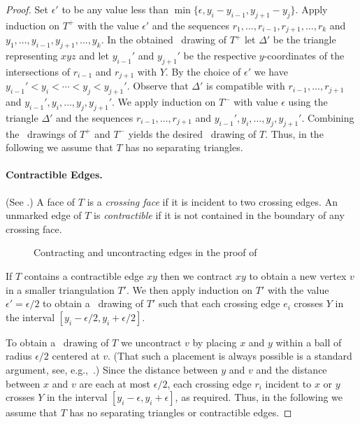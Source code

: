 \begin{proof}
	Set $\epsilon'$ to be any
	value less than $\min\{\epsilon,y_{i}-y_{i-1}, y_{j+1}-y_j\}$. Apply induction on $T^+$ with the value $\epsilon'$ and the sequences $r_1,\ldots,r_{i-1},r_{j+1},\ldots,r_k$ and
	$y_1,\ldots,y_{i-1},y_{j+1},\ldots,y_k$. In the obtained \Fary\ drawing of $T^+$ let $\Delta'$ be the triangle representing  $xyz$ and let $y_{i-1}'$ and $y_{j+1}'$
	be the respective $y$-coordinates of the intersections of
	$r_{i-1}$ and $r_{j+1}$ with $Y$.  By the choice of
	$\epsilon'$ we have $y_{i-1}'<y_i<\cdots<y_j<y_{j+1}'$.  Observe that
	$\Delta'$ is compatible with $r_{i-1},\ldots,r_{j+1}$ and
	$y_{i-1}',y_i,\ldots,y_j,y_{j+1}'$.
	We apply induction on $T^-$ with value $\epsilon$ using the triangle $\Delta'$ and the sequences $r_{i-1},\ldots,r_{j+1}$ and
	$y_{i-1}',y_i,\ldots,y_{j},y_{j+1}'$.  Combining the \Fary\ drawings of $T^+$
	and $T^-$ yields the desired \Fary\ drawing of $T$.  Thus, in the following we assume that $T$ has no separating triangles.
	
	\paragraph{Contractible Edges.}
	(See .)
	A face of $T$ is a \emph{crossing
		face} if it is incident to two crossing edges.  An
	unmarked edge of $T$ is \emph{contractible} if it is not contained
	in the boundary of any crossing face.  
	\begin{figure}
		\caption{Contracting and uncontracting edges in the proof of
			}
	\end{figure}
	
	If $T$ contains a contractible edge $xy$ then we contract $xy$ to
	obtain a new vertex $v$ in a smaller triangulation $T'$.   We then apply
	induction on $T'$ with the value $\epsilon'=\epsilon/2$ to obtain a \Fary\
	drawing of $T'$ such that each crossing edge $e_i$ crosses
	$Y$ in the interval $[y_i-\epsilon/2,y_i+\epsilon/2]$.
	
	To obtain a \Fary\ drawing of $T$ we uncontract $v$ by placing $x$ and $y$
	within a ball of radius $\epsilon/2$ centered at $v$. (That such
	a placement is always possible is a standard argument, see, e.g.,~\cite{fary,w-sp-05}.)  Since the
	distance between $y$ and $v$ and the distance between $x$ and $v$ are each at most $\epsilon/2$,
	each crossing edge $r_i$ incident to $x$ or $y$ crosses $Y$ in the interval $[y_i-\epsilon,y_i+\epsilon]$, as required.
	Thus, in the following we assume that $T$ has no separating triangles or contractible
	edges.
	

\end{proof}
